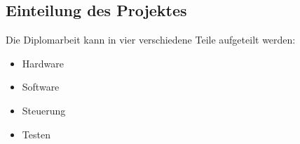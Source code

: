 \subsection{Einteilung des Projektes}
Die Diplomarbeit kann in vier verschiedene Teile aufgeteilt werden:\\
\begin{itemize}
    \item Hardware
    \item Software
    \item Steuerung
    \item Testen 
\end{itemize}
\vspace{5mm}
